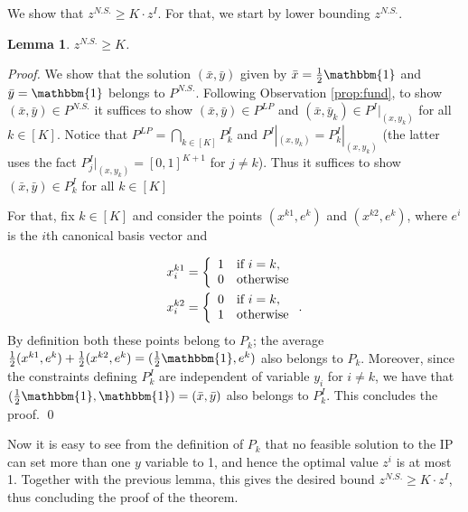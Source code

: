 \documentclass[smallextended]{svjour3}
\newtheorem{lemma}[proposition]{Lemma}
\begin{document}
	We show that $z^{N.S.} \ge K \cdot z^I$. For that, we start by lower bounding $z^{N.S.}$. 

	\begin{lemma}
		$z^{N.S.} \geq K$.
	\end{lemma}
	
	\begin{proof}
		We show that the solution $(\bar{x}, \bar{y})$ given by $\bar{x} = \frac{1}{2} {\mathbbm{1}}$ and $\bar{y} = {\mathbbm{1}}$ belongs to $P^{N.S.}$. 	Following Observation \ref{prop:fund}, to show $(\bar{x},\bar{y}) \in P^{N.S.}$ it suffices to show $(\bar{x},\bar{y}) \in P^{LP}$ and $(\bar{x}, \bar{y}_k) \in P^I|_{(x,y_k)}$ for all $k \in [K]$. Notice that $P^{LP} = \bigcap_{k \in [K]} P^I_k$ and $P^I|_{(x,y_k)} = P^I_k|_{(x,y_k)}$ (the latter uses the fact $P^I_j|_{(x,y_k)} = [0,1]^{K+1}$ for $j \neq k$). Thus it suffices to show $(\bar{x}, \bar{y}) \in P^I_k$ for all $k \in [K]$
	
		 For that, fix $k \in [K]$ and consider the points $(x^{k1}, e^k)$ and $(x^{k2}, e^k)$, where $e^i$ is the $i$th canonical basis vector and 
	
	\begin{align*}
		&x^{k1}_i = \left\{\begin{array}{rl} 1& \textup{if } i = k,\\
		 0 & \textup{otherwise}
		\end{array}\right.\\
		&x^{k2}_i = \left\{\begin{array}{rl} 0& \textup{if } i = k,\\
		 1 & \textup{otherwise}
		\end{array}\right. .
	\end{align*}
	By definition both these points belong to $P_k$; the average $\frac{1}{2} (x^{k1}, e^k) + \frac{1}{2} (x^{k2}, e^k) = (\frac{1}{2} {\mathbbm{1}}, e^k)$ also belongs to $P_k$. Moreover, since the constraints defining $P^I_k$ are independent of variable $y_i$ for $i \neq k$, we have that $(\frac{1}{2} {\mathbbm{1}}, {\mathbbm{1}}) = (\bar{x}, \bar{y})$ also belongs to $P^I_k$. This concludes the proof. {
\ifmp
	\hfill \qed
\fi
}
	\end{proof}

	Now it is easy to see from the definition of $P_k$ that no feasible solution to the IP can set more than one $y$ variable to 1, and hence the optimal value $z^i$ is at most 1. Together with the previous lemma, this gives the desired bound $z^{N.S.} \ge K \cdot z^I$, thus concluding the proof of the theorem. 
	
\end{document}
